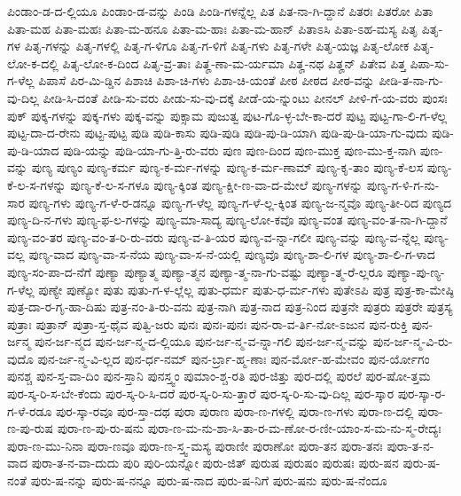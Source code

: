 {ಪಿಂಡಾಂ-ಡ-ದ-ಲ್ಲಿಯೂ
ಪಿಂಡಾಂ-ಡ-ವನ್ನು
ಪಿಂಡಿ
ಪಿಂಡಿ-ಗಳನ್ನೆಲ್ಲ
ಪಿತ
ಪಿತ-ನಾ-ಗಿ-ದ್ದಾನೆ
ಪಿತರಃ
ಪಿತರೋ
ಪಿತಾ
ಪಿತಾ-ಮಹ
ಪಿತಾ-ಮಹಃ
ಪಿತಾ-ಮ-ಹನೂ
ಪಿತಾ-ಮ-ಹಾಃ
ಪಿತಾ-ಮ-ಹಾನ್
ಪಿತಾಽಸಿ
ಪಿತಾ-ಽಹ-ಮಸ್ಯ
ಪಿತೃ
ಪಿತೃ-ಗಳ
ಪಿತೃ-ಗಳನ್ನು
ಪಿತೃ-ಗಳಲ್ಲಿ
ಪಿತೃ-ಗ-ಳಿಗೂ
ಪಿತೃ-ಗ-ಳಿಗೆ
ಪಿತೃ-ಗಳು
ಪಿತೃ-ಗಳೇ
ಪಿತೃ-ಯಜ್ಞ
ಪಿತೃ-ಲೋಕ
ಪಿತೃ-ಲೋ-ಕ-ದಲ್ಲಿ
ಪಿತೃ-ಲೋ-ಕ-ದಿಂದ
ಪಿತೃ-ವ್ರ-ತಾಃ
ಪಿತೄ-ಣಾ-ಮ-ರ್ಯಮಾ
ಪಿತೄ-ನಥ
ಪಿತೄನ್
ಪಿತೇವ
ಪಿತ್ತ
ಪಿಪಾ-ಸು-ಗ-ಳೆಲ್ಲ
ಪಿಪಾಸೆ
ಪಿರ-ಮಿ-ಡ್ಡಿನ
ಪಿಶಾಚಿ
ಪಿಶಾ-ಚಿ-ಗಳು
ಪಿಶಾ-ಚಿ-ಯಂತೆ
ಪೀಠ
ಪೀಠದ
ಪೀಠ-ವನ್ನು
ಪೀಡಿ-ತ-ನಾ-ಗು-ವು-ದಿಲ್ಲ
ಪೀಡಿ-ಸಿ-ದಂತೆ
ಪೀಡಿ-ಸು-ವರು
ಪೀಡು-ಸು-ವು-ದಕ್ಕೆ
ಪೀಡೆ-ಯ-ನ್ನುಂಟು
ಪೀನಲ್
ಪೀಳಿ-ಗೆ-ಯ-ವರು
ಪುಂಸಃ
ಪುಕ್
ಪುಕ್ಕ-ಗಳನ್ನು
ಪುಕ್ಕ-ಗಳು
ಪುಕ್ಕ-ವನ್ನು
ಪುಕ್ಸಾಮ
ಪುಜುತ್ವ
ಪುಟ-ಗೊ-ಳ್ಳ-ಬೇ-ಕಾ-ದರೆ
ಪುಟ್ಟ
ಪುಟ್ಟ-ಗಾ-ಲಿ-ಗ-ಳೆಲ್ಲ
ಪುಟ್ಟ-ದಾ-ದ-ರೇನು
ಪುಟ್ಟ-ಪುಟ್ಟ
ಪುಡಿ
ಪುಡಿ-ಕಾಸು
ಪುಡಿ-ಪುಡಿ
ಪುಡಿ-ಪು-ಡಿ-ಯಾಗಿ
ಪುಡಿ-ಪು-ಡಿ-ಯಾ-ಗು-ವುದು
ಪುಡಿ-ಪು-ಡಿ-ಯಾದ
ಪುಡಿ-ಯನ್ನು
ಪುಡಿ-ಯಾ-ಗು-ತ್ತಿ-ರು-ವರು
ಪುಣ
ಪುಣ-ದಿಂದ
ಪುಣ-ಮುಕ್ತ
ಪುಣ-ಮು-ಕ್ತ-ನಾಗಿ
ಪುಣ-ವನ್ನು
ಪುಣ್ಯ
ಪುಣ್ಯಂ
ಪುಣ್ಯ-ಕರ್ಮ
ಪುಣ್ಯ-ಕ-ರ್ಮ-ಗಳನ್ನು
ಪುಣ್ಯ-ಕ-ರ್ಮ-ಣಾಮ್
ಪುಣ್ಯ-ಕೃ-ತಾಂ
ಪುಣ್ಯ-ಕೆ-ಲಸ
ಪುಣ್ಯ-ಕೆ-ಲ-ಸ-ಗಳನ್ನು
ಪುಣ್ಯ-ಕೆ-ಲ-ಸ-ಗಳೂ
ಪುಣ್ಯ-ಕ್ಕಿಂತ
ಪುಣ್ಯ-ಕ್ಷೀ-ಣ-ವಾ-ದ-ಮೇಲೆ
ಪುಣ್ಯ-ಗಳನ್ನು
ಪುಣ್ಯ-ಗ-ಳಿ-ಗ-ನು-ಸಾರ
ಪುಣ್ಯ-ಗಳು
ಪುಣ್ಯ-ಗ-ಳೆ-ರ-ಡನ್ನೂ
ಪುಣ್ಯ-ಗ-ಳೆಲ್ಲ
ಪುಣ್ಯ-ಗ-ಳೆ-ಲ್ಲ-ಕ್ಕಿಂತ
ಪುಣ್ಯ-ಜ-ನ್ಮವೊ
ಪುಣ್ಯ-ತೀ-ರಿದ
ಪುಣ್ಯದ
ಪುಣ್ಯ-ದಿ-ನ-ಗಳು
ಪುಣ್ಯ-ಫ-ಲ-ಗಳನ್ನು
ಪುಣ್ಯ-ಮಾ-ಸಾದ್ಯ
ಪುಣ್ಯ-ಲೋ-ಕವೊ
ಪುಣ್ಯ-ವಂತ
ಪುಣ್ಯ-ವಂ-ತ-ನಾ-ಗಿ-ದ್ದಾನೆ
ಪುಣ್ಯ-ವಂ-ತರ
ಪುಣ್ಯ-ವಂ-ತ-ರಿ-ರು-ವರು
ಪುಣ್ಯ-ವ-ತಿ-ಯರ
ಪುಣ್ಯ-ವ-ನ್ನಾ-ಗಲೀ
ಪುಣ್ಯ-ವನ್ನು
ಪುಣ್ಯ-ವ-ನ್ನೆಲ್ಲ
ಪುಣ್ಯ-ವಲ್ಲ
ಪುಣ್ಯ-ವಾದ
ಪುಣ್ಯ-ವಾ-ಸ-ನೆಯ
ಪುಣ್ಯ-ವಾ-ಸ-ನೆ-ಯಲ್ಲಿ
ಪುಣ್ಯವೊ
ಪುಣ್ಯ-ಶಾ-ಲಿ-ಗಳ
ಪುಣ್ಯ-ಶಾ-ಲಿ-ಗ-ಳಾದ
ಪುಣ್ಯ-ಸಂ-ಪಾ-ದ-ನೆಗೆ
ಪುಣ್ಯಾ
ಪುಣ್ಯಾತ್ಮ
ಪುಣ್ಯಾ-ತ್ಮನ
ಪುಣ್ಯಾ-ತ್ಮ-ನಾ-ಗು-ವಷ್ಟು
ಪುಣ್ಯಾ-ತ್ಮ-ರೆ-ಲ್ಲರೂ
ಪುಣ್ಯಾ-ಪು-ಣ್ಯ-ಗ-ಳೆಲ್ಲ
ಪುಣ್ಯೇ
ಪುಣ್ಯೋ
ಪುತು
ಪುತು-ಗ-ಳ-ಲ್ಲೆಲ್ಲ
ಪುತು-ಧರ್ಮ
ಪುತು-ಧ-ರ್ಮ-ಗಳು
ಪುತೇಽಪಿ
ಪುತ್ರ
ಪುತ್ರ-ಕಾ-ಮೇಷ್ಠಿ
ಪುತ್ರ-ದಾ-ರ-ಗೃ-ಹಾ-ದಿಷು
ಪುತ್ರ-ನಂ-ತಿ-ರು-ವನು
ಪುತ್ರ-ನಾಗಿ
ಪುತ್ರ-ನಾದ
ಪುತ್ರ-ನಿಂದ
ಪುತ್ರನೇ
ಪುತ್ರರು
ಪುತ್ರರೇ
ಪುತ್ರಸ್ಯ
ಪುತ್ರಾಃ
ಪುತ್ರಾನ್
ಪುತ್ರಾ-ಸ್ತ-ಥೈವ
ಪುತ್ವಿ-ಜರು
ಪುನಃ
ಪುನಃ-ಪುನಃ
ಪುನ-ರಾ-ವ-ರ್ತಿ-ನೋ-ಽಜುನ
ಪುನ-ರುಕ್ತಿ
ಪುನ-ರ್ಜನ್ಮ
ಪುನ-ರ್ಜ-ನ್ಮದ
ಪುನ-ರ್ಜ-ನ್ಮ-ದ-ಲ್ಲಿಯೂ
ಪುನ-ರ್ಜ-ನ್ಮ-ವ-ನ್ನಾ-ಗಲಿ
ಪುನ-ರ್ಜ-ನ್ಮ-ವನ್ನು
ಪುನ-ರ್ಜ-ನ್ಮ-ವಿ-ರು-ವುದೊ
ಪುನ-ರ್ಜ-ನ್ಮ-ವಿ-ಲ್ಲದ
ಪುನ-ರ್ಧ-ನಮ್
ಪುನ-ರ್ಬ್ರಾ-ಹ್ಮ-ಣಾಃ
ಪುನ-ರ್ಮೋ-ಹ-ಮೇವಂ
ಪುನ-ರ್ಯೋಗಂ
ಪುನಶ್ಚ
ಪುನ-ಸ್ತ-ವಾ-ದಿಂ
ಪುನ-ಸ್ತಾನಿ
ಪುನಸ್ತ್ವಂ
ಪುಮಾಂ-ಶ್ಚ-ರತಿ
ಪುರ-ಜಿತ್ತು
ಪುರ-ದಲ್ಲಿ
ಪುರಲೆ
ಪುರ-ಷೋ-ತ್ತಮ
ಪುರ-ಸ್ಕ-ರಿ-ಸ-ಬೇ-ಕೆಂದು
ಪುರ-ಸ್ಕ-ರಿ-ಸಿ-ದರೆ
ಪುರ-ಸ್ಕ-ರಿ-ಸು-ತ್ತಾರೆ
ಪುರ-ಸ್ಕ-ರಿ-ಸು-ವು-ದಿಲ್ಲ
ಪುರ-ಸ್ಕಾರ
ಪುರ-ಸ್ಕಾ-ರ-ಗ-ಳೆ-ರಡೂ
ಪುರ-ಸ್ಕಾ-ರವೂ
ಪುರ-ಸ್ತಾ-ದಥ
ಪುರಾ
ಪುರಾಣ
ಪುರಾ-ಣ-ಗಳಲ್ಲಿ
ಪುರಾ-ಣ-ಗಳು
ಪುರಾ-ಣ-ದಲ್ಲಿ
ಪುರಾ-ಣ-ಪು-ರುಷ
ಪುರಾ-ಣ-ಪು-ರು-ಷನು
ಪುರಾ-ಣ-ಮ-ನು-ಶಾ-ಸಿ-ತಾ-ರ-ಮ-ಣೋ-ರ-ಣೀ-ಯಾಂ-ಸ-ಮ-ನು-ಸ್ಮ-ರೇದ್ಯಃ
ಪುರಾ-ಣ-ಮು-ನಿನಾ
ಪುರಾ-ಣವೂ
ಪುರಾ-ಣ-ಸ್ತ್ವ-ಮಸ್ಯ
ಪುರಾಣೀ
ಪುರಾಣೋ
ಪುರಾ-ತನ
ಪುರಾ-ತನಃ
ಪುರಾ-ತ-ನ-ವಾದ
ಪುರಾ-ತ-ನ-ವಾ-ದುದು
ಪುರಿ
ಪುರಿ-ಯನ್ನೋ
ಪುರು-ಜಿತ್
ಪುರುಷ
ಪುರುಷಂ
ಪುರುಷಃ
ಪುರು-ಷನ
ಪುರು-ಷ-ನಂತೆ
ಪುರು-ಷ-ನನ್ನು
ಪುರು-ಷ-ನನ್ನೂ
ಪುರು-ಷ-ನಾದ
ಪುರು-ಷ-ನಿಗೆ
ಪುರು-ಷನು
ಪುರು-ಷ-ನೆಂದೂ
}
